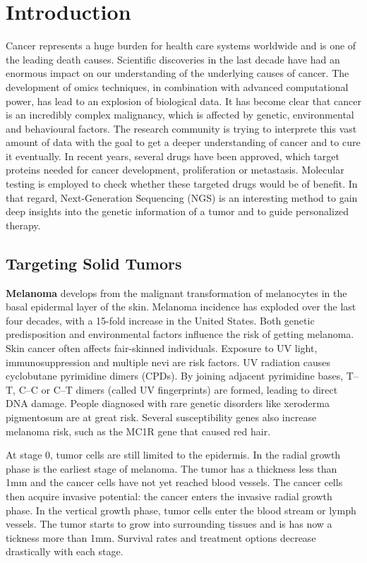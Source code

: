 \section{Introduction}

  Cancer represents a huge burden for health care systems worldwide and is one
  of the leading death causes. Scientific discoveries in the last decade have
  had an enormous impact on our understanding of the underlying causes of
  cancer. The development of omics techniques, in combination with advanced
  computational power, has lead to an explosion of biological data. It has
  become clear that cancer is an incredibly complex malignancy, which is
  affected by genetic, environmental and behavioural factors. The research
  community is trying to interprete this vast amount of data with the goal to
  get a deeper understanding of cancer and to cure it eventually. In recent
  years, several drugs have been approved, which target proteins needed for cancer
  development, proliferation or metastasis. Molecular testing is employed to
  check whether these targeted drugs would be of benefit. In that regard,
  Next-Generation Sequencing (NGS) is an interesting method to gain deep
  insights into the genetic information of a tumor and to guide personalized
  therapy.

  \subsection{Targeting Solid Tumors}

    \textbf{Melanoma} develops from the malignant transformation of melanocytes
    in the basal epidermal layer of the skin. Melanoma incidence has exploded
    over the last four decades, with a 15-fold increase in the United States.
    Both genetic predisposition and environmental factors influence the risk
    of getting melanoma. Skin cancer often affects fair-skinned individuals.
    Exposure to UV light, immunosuppression and multiple nevi are risk factors.
    UV radiation causes cyclobutane pyrimidine dimers (CPDs). By joining
    adjacent pyrimidine bases, T--T, C--C or C--T dimers (called UV
    fingerprints) are formed, leading to direct DNA damage. People diagnosed
    with rare genetic disorders like xeroderma pigmentosum are at great risk.
    Several susceptibility genes also increase melanoma risk, such as the MC1R
    gene that caused red hair.

    At stage 0, tumor cells are still limited to the epidermis. In the radial growth phase is the earliest stage of melanoma. The tumor has a
    thickness less than 1mm and the cancer cells have not yet reached blood
    vessels. The cancer cells then acquire invasive potential: the cancer enters
    the invasive radial growth phase. In the vertical growth phase, tumor cells
    enter the blood stream or lymph vessels. The tumor starts to grow into
    surrounding tissues and is has now a tickness more than 1mm. Survival rates
    and treatment options decrease drastically with each stage.

